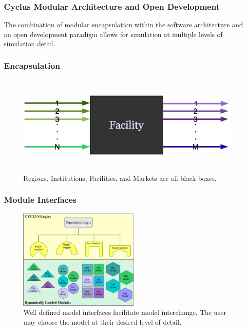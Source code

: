 \begin{frame}
  \frametitle{Cyclus Modular Architecture and Open Development}
  The combination of modular encapsulation within the software
  architecture and an open development paradigm allows for simulation
  at multiple levels of simulation detail.
\end{frame}
\begin{frame}[ctb!]
  \frametitle{Encapsulation}
  \begin{figure}[htbp!]
    \begin{center}
      \includegraphics[height=5cm]{facility.eps}
    \end{center}
    \caption{ Regions, Institutions, Facilities, and Markets are all
    black boxes.} 
    \label{fig:sinkfacility}
  \end{figure}
\end{frame}
\begin{frame}[ctb!]
  \frametitle{Module Interfaces}
  \begin{figure}[htbp!]
    \begin{center}
      \includegraphics[height=5cm]{interfaces.eps}
    \caption{Well defined model interfaces facilitate model 
    interchange. The user may choose the model at their desired level  
    of detail.}
    \label{fig:interfaces}
    \end{center}
  \end{figure}
\end{frame}

